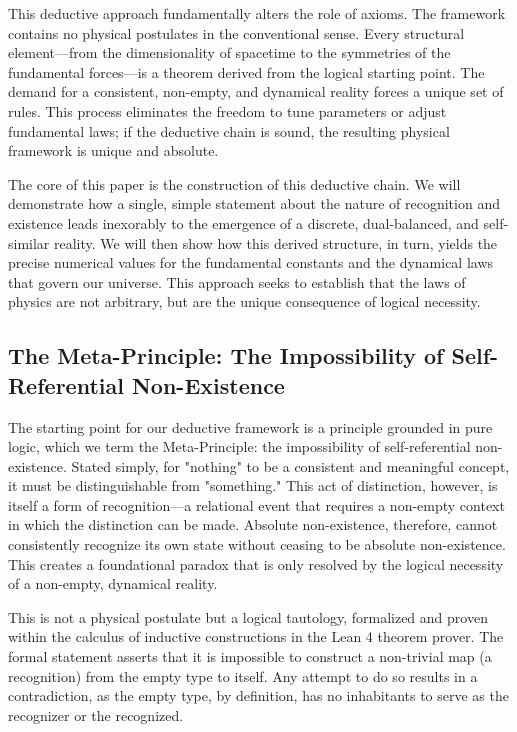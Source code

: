 \documentclass[11pt,a4paper]{article}
\begin{document}
This deductive approach fundamentally alters the role of axioms. The framework contains no physical postulates in the conventional sense. Every structural element—from the dimensionality of spacetime to the symmetries of the fundamental forces—is a theorem derived from the logical starting point. The demand for a consistent, non-empty, and dynamical reality forces a unique set of rules. This process eliminates the freedom to tune parameters or adjust fundamental laws; if the deductive chain is sound, the resulting physical framework is unique and absolute.

The core of this paper is the construction of this deductive chain. We will demonstrate how a single, simple statement about the nature of recognition and existence leads inexorably to the emergence of a discrete, dual-balanced, and self-similar reality. We will then show how this derived structure, in turn, yields the precise numerical values for the fundamental constants and the dynamical laws that govern our universe. This approach seeks to establish that the laws of physics are not arbitrary, but are the unique consequence of logical necessity.

\subsection{The Meta-Principle: The Impossibility of Self-Referential Non-Existence}
The starting point for our deductive framework is a principle grounded in pure logic, which we term the Meta-Principle: the impossibility of self-referential non-existence. Stated simply, for "nothing" to be a consistent and meaningful concept, it must be distinguishable from "something." This act of distinction, however, is itself a form of recognition—a relational event that requires a non-empty context in which the distinction can be made. Absolute non-existence, therefore, cannot consistently recognize its own state without ceasing to be absolute non-existence. This creates a foundational paradox that is only resolved by the logical necessity of a non-empty, dynamical reality.

This is not a physical postulate but a logical tautology, formalized and proven within the calculus of inductive constructions in the Lean 4 theorem prover. The formal statement asserts that it is impossible to construct a non-trivial map (a recognition) from the empty type to itself. Any attempt to do so results in a contradiction, as the empty type, by definition, has no inhabitants to serve as the recognizer or the recognized.
\end{document}
